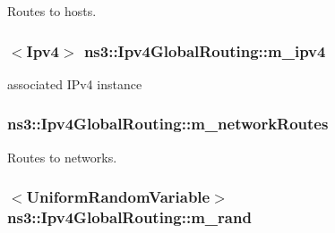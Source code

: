 Routes to hosts. 

\subsubsection[{\texorpdfstring{m\+\_\+ipv4}{m_ipv4}}]{$<${\bf Ipv4}$>$ ns3\+::\+Ipv4\+Global\+Routing\+::m\+\_\+ipv4\hspace{0.3cm}{\ttfamily [private]}}\hypertarget{classns3_1_1Ipv4GlobalRouting_a8ca97d33982a32fa41a98b56dbec2edc}{}\label{classns3_1_1Ipv4GlobalRouting_a8ca97d33982a32fa41a98b56dbec2edc}


associated I\+Pv4 instance 

\subsubsection[{\texorpdfstring{m\+\_\+network\+Routes}{m_networkRoutes}}]{ ns3\+::\+Ipv4\+Global\+Routing\+::m\+\_\+network\+Routes\hspace{0.3cm}{\ttfamily [private]}}\hypertarget{classns3_1_1Ipv4GlobalRouting_aef3903663955f6f9a411be06752f3976}{}\label{classns3_1_1Ipv4GlobalRouting_aef3903663955f6f9a411be06752f3976}


Routes to networks. 

\subsubsection[{\texorpdfstring{m\+\_\+rand}{m_rand}}]{$<${\bf Uniform\+Random\+Variable}$>$ ns3\+::\+Ipv4\+Global\+Routing\+::m\+\_\+rand\hspace{0.3cm}{\ttfamily [private]}}\hypertarget{classns3_1_1Ipv4GlobalRouting_a3cc74017538737dc3f6ec7f511a3481e}{}\label{classns3_1_1Ipv4GlobalRouting_a3cc74017538737dc3f6ec7f511a3481e}


